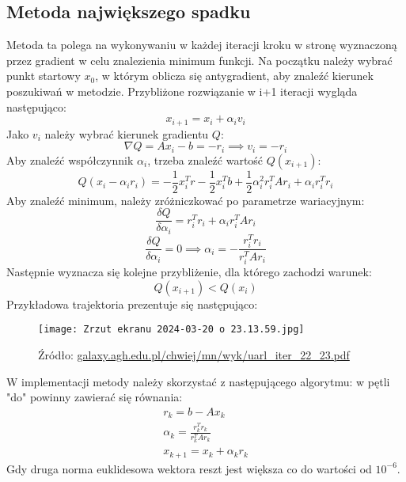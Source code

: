 \documentclass{article}
\begin{document}
\subsection{Metoda największego spadku}
Metoda ta polega na wykonywaniu w każdej iteracji kroku w stronę wyznaczoną przez gradient w celu znalezienia minimum funkcji. Na początku należy wybrać punkt startowy $x_0$, w którym oblicza się antygradient, aby znaleźć kierunek poszukiwań w metodzie. Przybliżone rozwiązanie w i+1 iteracji wygląda następująco:
\begin{equation*}
    x_{i+1} = x_i + \alpha_iv_i
\end{equation*}
Jako $v_i$ należy wybrać kierunek gradientu $Q$:
\begin{equation*}
    \nabla Q = Ax_i - b = -r_i \implies v_i = -r_i
\end{equation*}
Aby znaleźć współczynnik $\alpha_i$, trzeba znaleźć wartość $Q(x_{i+1})$:
\begin{equation*}
    Q(x_i - \alpha_ir_i) = -\frac{1}{2}x_i^Tr - \frac{1}{2}x_i^Tb + \frac{1}{2}\alpha_i^2r_i^TAr_i + \alpha_ir_i^Tr_i
\end{equation*}
Aby znaleźć minimum, należy zróżniczkować po parametrze wariacyjnym:
\begin{equation*}
    \frac{\delta Q}{\delta \alpha_i} = r_i^Tr_i + \alpha_ir_i^TAr_i
\end{equation*}
\begin{equation*}
    \frac{\delta Q}{\delta \alpha_i} = 0 \implies \alpha_i = -\frac{r_i^Tr_i}{r_i^TAr_i}
\end{equation*}
Następnie wyznacza się kolejne przybliżenie, dla którego zachodzi warunek: 
\begin{equation*}
    Q(x_{i+1}) < Q(x_i) 
\end{equation*}
Przykładowa trajektoria prezentuje się następująco:
\begin{figure}[H]
    \centering
    \texttt{[image: Zrzut ekranu 2024-03-20 o 23.13.59.jpg]}
    \caption*{\small{Źródło: \url{galaxy.agh.edu.pl/chwiej/mn/wyk/uarl_iter_22_23.pdf}}}
    \label{fig:enter-label}
\end{figure}
W implementacji metody należy skorzystać z następującego algorytmu: w pętli "do" powinny zawierać się równania:
\begin{gather*}
    r_k = b-Ax_k \\
    \alpha_k = \frac{r_k^Tr_k}{r_k^TAr_k}\\
    x_{k+1}=x_k+\alpha_kr_k
\end{gather*}
Gdy druga norma euklidesowa wektora reszt jest większa co do wartości od $10^{-6}$.
\end{document}

